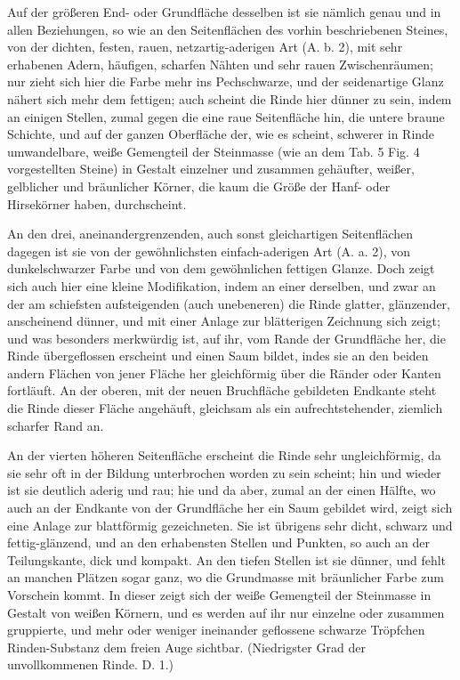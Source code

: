 \documentclass[a4paper, 11pt, oneside, german]{article}
\begin{document}
Auf der größeren End- oder Grundfläche desselben ist sie nämlich genau und in allen Beziehungen, so wie an den Seitenflächen des vorhin beschriebenen Steines, von der dichten, festen, rauen, netzartig-aderigen Art (A. b. 2), mit sehr erhabenen Adern, häufigen, scharfen Nähten und sehr rauen Zwischenräumen; nur zieht sich hier die Farbe mehr ins Pechschwarze, und der seidenartige Glanz nähert sich mehr dem fettigen; auch scheint die Rinde hier dünner zu sein, indem an einigen Stellen, zumal gegen die eine raue Seitenfläche hin, die untere braune Schichte, und auf der ganzen Oberfläche der, wie es scheint, schwerer in Rinde umwandelbare, weiße Gemengteil der Steinmasse (wie an dem Tab. 5 Fig. 4 vorgestellten Steine) in Gestalt einzelner und zusammen gehäufter, weißer, gelblicher und bräunlicher Körner, die kaum die Größe der Hanf- oder Hirsekörner haben, durchscheint.

An den drei, aneinandergrenzenden, auch sonst gleichartigen Seitenflächen dagegen ist sie von der gewöhnlichsten einfach-aderigen Art (A. a. 2), von dunkelschwarzer Farbe und von dem gewöhnlichen fettigen Glanze. Doch zeigt sich auch hier eine kleine Modifikation, indem an einer derselben, und zwar an der am schiefsten aufsteigenden (auch unebeneren) die Rinde glatter, glänzender, anscheinend dünner, und mit einer Anlage zur blätterigen Zeichnung sich zeigt; und was besonders merkwürdig ist, auf ihr, vom Rande der Grundfläche her, die Rinde übergeflossen erscheint und einen Saum bildet, indes sie an den beiden andern Flächen von jener Fläche her gleichförmig über die Ränder oder Kanten fortläuft. An der oberen, mit der neuen Bruchfläche gebildeten Endkante steht die Rinde dieser Fläche angehäuft, gleichsam als ein aufrechtstehender, ziemlich scharfer Rand an.

An der vierten höheren Seitenfläche erscheint die Rinde sehr ungleichförmig, da sie sehr oft in der Bildung unterbrochen worden zu sein scheint; hin und wieder ist sie deutlich aderig und rau; hie und da aber, zumal an der einen Hälfte, wo auch an der Endkante von der Grundfläche her ein Saum gebildet wird, zeigt sich eine Anlage zur blattförmig gezeichneten. Sie ist übrigens sehr dicht, schwarz und fettig-glänzend, und an den erhabensten Stellen und Punkten, so auch an der Teilungskante, dick und kompakt. An den tiefen Stellen ist sie dünner, und fehlt an manchen Plätzen sogar ganz, wo die Grundmasse mit bräunlicher Farbe zum Vorschein kommt. In dieser zeigt sich der weiße Gemengteil der Steinmasse in Gestalt von weißen Körnern, und es werden auf ihr nur einzelne oder zusammen gruppierte, und mehr oder weniger ineinander geflossene schwarze Tröpfchen Rinden-Substanz dem freien Auge sichtbar. (Niedrigster Grad der unvollkommenen Rinde. D. 1.)
\end{document}
